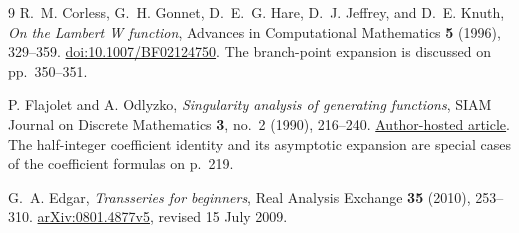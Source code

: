 \documentclass[11pt,a4paper]{article}
\theoremstyle{definition}
\theoremstyle{remark}
\begin{document}
\begin{thebibliography}{9}
R.~M. Corless, G.~H. Gonnet, D.~E.~G. Hare, D.~J. Jeffrey, and D.~E. Knuth,
\emph{On the Lambert W function}, Advances in Computational Mathematics
\textbf{5} (1996), 329--359.
\href{https://doi.org/10.1007/BF02124750}{doi:10.1007/BF02124750}.
The branch-point expansion is discussed on pp.~350--351.

P. Flajolet and A. Odlyzko,
\emph{Singularity analysis of generating functions},
SIAM Journal on Discrete Mathematics \textbf{3}, no.~2 (1990), 216--240.
\href{https://algo.inria.fr/flajolet/Publications/FlOd90b.pdf}{Author-hosted article}.
The half-integer coefficient identity and its asymptotic expansion are
special cases of the coefficient formulas on p.~219.

G.~A. Edgar, \emph{Transseries for beginners},
Real Analysis Exchange \textbf{35} (2010), 253--310.
\href{https://arxiv.org/abs/0801.4877v5}{arXiv:0801.4877v5}, revised 15 July 2009.

\end{thebibliography}
\endgroup
\end{document}
